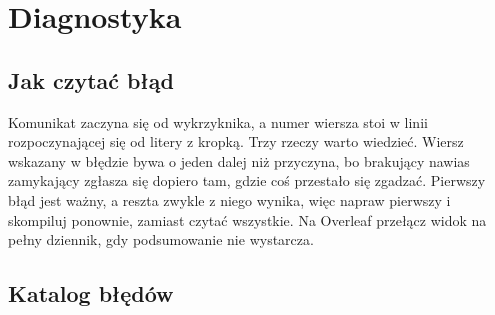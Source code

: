 \section{Diagnostyka}\label{sec:diagnostyka}

\subsection{Jak czytać błąd}

Komunikat zaczyna się od wykrzyknika, a numer wiersza stoi w linii rozpoczynającej się od litery  z kropką. Trzy rzeczy warto wiedzieć. Wiersz wskazany w błędzie bywa o jeden dalej niż przyczyna, bo brakujący nawias zamykający zgłasza się dopiero tam, gdzie coś przestało się zgadzać. Pierwszy błąd jest ważny, a reszta zwykle z niego wynika, więc napraw pierwszy i skompiluj ponownie, zamiast czytać wszystkie. Na Overleaf przełącz widok na pełny dziennik, gdy podsumowanie nie wystarcza.

\subsection{Katalog błędów}

